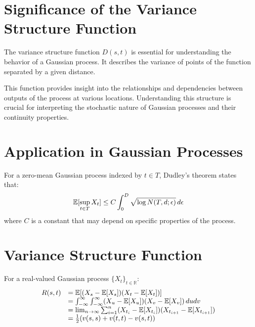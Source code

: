 \documentclass{article}
\begin{document}
\section{Significance of the Variance Structure Function}

The variance structure function $D (s, t)$ is essential for understanding the
behavior of a Gaussian process. It describes the variance of points of the
function separated by a given distance.

This function provides insight into the relationships and dependencies between
outputs of the process at various locations. Understanding this structure is
crucial for interpreting the stochastic nature of Gaussian processes and their
continuity properties.

\section{Application in Gaussian Processes}

For a zero-mean Gaussian process indexed by $t \in T$, Dudley's theorem states
that:
\begin{equation}
  \mathbb{E} [\sup_{t \in T} X_t] \leq C \int_0^D \sqrt{\log N (T, d ;
  \epsilon)}  \hspace{0.17em} d \epsilon
\end{equation}
where $C$ is a constant that may depend on specific properties of the process.

\section{Variance Structure Function}

{\noindent}For a real-valued Gaussian process $\{X_t \}_{t \in \mathbb{R}}$:
\begin{equation}
  \begin{array}{ll}
    R (s, t) & =\mathbb{E} [(X_s -\mathbb{E}[X_s]) (X_t -\mathbb{E}[X_t])]\\
    & = \int_{- \infty}^{\infty} \int_{- \infty}^{\infty} (X_u
    -\mathbb{E}[X_u])  (X_v -\mathbb{E}[X_v])  \hspace{0.17em} dudv\\
    & = \lim_{n \to \infty}  \sum_{i = 1}^n (X_{t_i} -\mathbb{E}[X_{t_i}]) 
    (X_{t_{i + 1}} -\mathbb{E}[X_{t_{i + 1}}])\\
    & = \frac{1}{2}  (v (s, s) + v (t, t) - v (s, t))
  \end{array}
\end{equation}
\end{document}
